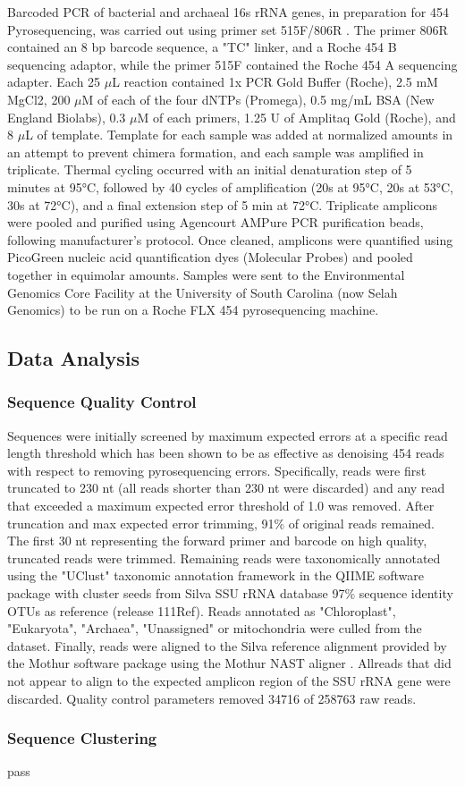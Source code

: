 Barcoded PCR of bacterial and archaeal 16s rRNA genes, in preparation for 454 Pyrosequencing, was carried out using primer set 515F/806R \cite{21349862}. The primer 806R contained an 8 bp barcode sequence, a "TC" linker, and a Roche 454 B sequencing adaptor, while the primer 515F contained the Roche 454 A sequencing adapter. Each 25 $\mu$L reaction contained 1x PCR Gold Buffer (Roche), 2.5 mM MgCl2, 200 $\mu$M of each of the four dNTPs (Promega), 0.5 mg/mL BSA (New England Biolabs), 0.3 $\mu$M of each primers, 1.25 U of Amplitaq Gold (Roche), and 8 $\mu$L of template. Template for each sample was added at normalized amounts in an attempt to prevent chimera formation, and each sample was amplified in triplicate. Thermal cycling occurred with an initial denaturation step of 5 minutes at 95°C, followed by 40 cycles of amplification (20s at 95°C, 20s at 53°C, 30s at 72°C), and a final extension step of 5 min at 72°C. Triplicate amplicons were pooled and purified using Agencourt AMPure PCR purification beads, following manufacturer’s protocol. Once cleaned, amplicons were quantified using PicoGreen nucleic acid quantification dyes (Molecular Probes) and pooled together in equimolar amounts. Samples were sent to the Environmental Genomics Core Facility at the University of South Carolina (now Selah Genomics) to be run on a Roche FLX 454 pyrosequencing machine. 

\subsection{Data Analysis} 

\subsubsection{Sequence Quality Control} Sequences were initially screened by maximum expected errors at a specific read length threshold \cite{23955772} which has been shown to be as effective as denoising 454 reads with respect to removing pyrosequencing errors. Specifically, reads were first truncated to 230 nt (all reads shorter than 230 nt were discarded) and any read that exceeded a maximum expected error threshold of 1.0 was removed. After truncation and max expected error trimming, 91\% of original reads remained. The first 30 nt representing the forward primer and barcode on high quality, truncated reads were trimmed. Remaining reads were taxonomically annotated using the "UClust" taxonomic annotation framework in the QIIME software package \cite{20383131, 20709691} with cluster seeds from Silva SSU rRNA database \cite{17947321} 97\% sequence identity OTUs as reference (release 111Ref). Reads annotated as "Chloroplast", "Eukaryota", "Archaea", "Unassigned" or mitochondria were culled from the dataset. Finally, reads were aligned to the Silva reference alignment provided by the Mothur software package \cite{19801464} using the Mothur NAST aligner \cite{16845035}. Allreads that did not appear to align to the expected amplicon region of the SSU rRNA gene were discarded. Quality control parameters removed 34716 of 258763 raw reads.

\subsubsection{Sequence Clustering}
pass